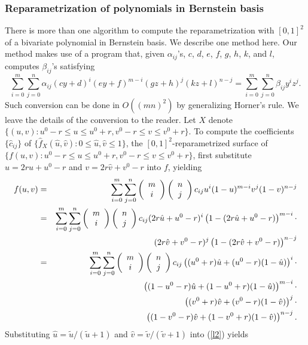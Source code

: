 \documentclass[12pt]{article}
\begin{document}
\subsubsection{Reparametrization of polynomials in Bernstein
basis}  There is more than one algorithm to compute the
reparametrization with $[0,1]^2$ of a bivariate polynomial in
Bernstein basis. We describe one method here. Our method makes use
of a program that, given $\alpha_{ij}$'s, $c$, $d$, $e$, $f$, $g$,
$h$, $k$, and $l$, computes $\beta_{ij}$'s satisfying
\[
\sum_{i=0}^m \sum_{j=0}^n
\alpha_{ij}(cy+d)^i(ey+f)^{m-i}(gz+h)^j(kz+l)^{n-j} =  \sum_{i=0}^m \sum_{j=0}^n \beta_{ij}y^iz^j.
\]
Such conversion can be done in $O\left((mn)^2\right)$ by
generalizing Horner's rule. We leave the details of the conversion
to the reader. Let $X$ denote $\{(u,v):u^0 - r \leq u \leq u^0+r,
v^0 - r \leq v \leq v^0+r \}$. To compute the coefficients
$\{\hat{c}_{ij}\}$ of $\{\hat{f}_X(\hat{u},\hat{v}) : 0 \leq
\hat{u}, \hat{v} \leq 1\}$, the $[0,1]^2$-reparametrized surface
of $\{f(u,v): u^0 - r \leq u \leq u^0+r, v^0 - r \leq v \leq v^0+r
\}$, first substitute $u = 2r \hat{u}+u^0-r$ and $v =
2r\hat{v}+v^0-r$ into $f$, yielding
\begin{eqnarray}
f(u,v) & = &
\sum_{i=0}^m \sum_{j=0}^n \left(\begin{array}{c} m\\ i \end{array} \right)\left(\begin{array}{c} n\\ j \end{array} \right)c_{ij}u^i(1-u)^{m-i}v^j(1-v)^{n-j} \nonumber \\
& = & \sum_{i=0}^m \sum_{j=0}^n \left(\begin{array}{c} m\\ i \end{array} \right)\left(\begin{array}{c} n\\ j \end{array} \right)c_{ij}(2r \hat{u}+u^0-r)^i\left(1-(2r \hat{u}+u^0-r)\right)^{m-i} \cdot \nonumber \\
& & \hspace{40 pt}(2r \hat{v}+v^0-r)^j\left(1-(2r \hat{v}+v^0-r)\right)^{n-j} \nonumber \\
& = & \sum_{i=0}^m \sum_{j=0}^n \left(\begin{array}{c} m\\ i \end{array} \right)\left(\begin{array}{c} n\\ j \end{array} \right)c_{ij}\left((u^0+r)\hat{u}+(u^0-r)(1-\hat{u})\right)^i
\cdot \nonumber \\
& & \hspace{40 pt}\left((1-u^0-r)\hat{u}+(1-u^0+r)(1-\hat{u})\right)^{m-i} \cdot \nonumber \\
& & \hspace{40 pt}\left((v^0+r)\hat{v}+(v^0-r)(1-\hat{v})\right)^j \cdot \nonumber \\
& & \hspace{40 pt}\left((1-v^0-r)\hat{v}+(1-v^0+r)(1-\hat{v})\right)^{n-j}. \label{l2}
\end{eqnarray}
Substituting $\hat{u} = \tilde{u}/(\tilde{u}+1)$ and $\hat{v} = \tilde{v}/(\tilde{v}+1)$
into (\ref{l2}) yields
\end{document}
